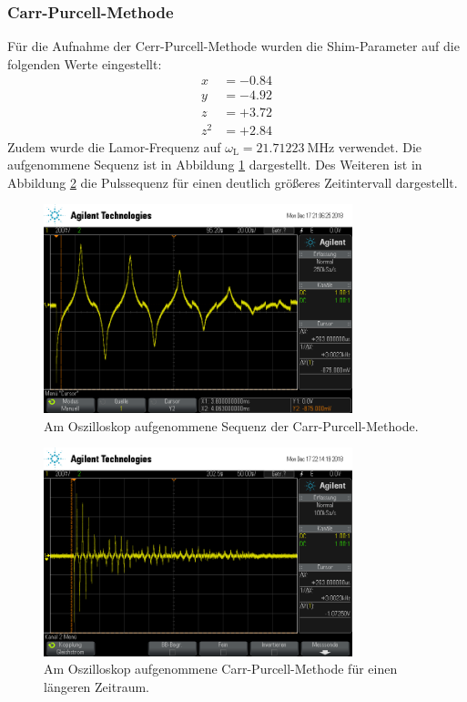 \subsubsection{Carr-Purcell-Methode}
Für die Aufnahme der Cerr-Purcell-Methode wurden die Shim-Parameter auf die
folgenden Werte eingestellt:
\begin{align*}
  x &= -\num{0.84} \\
  y &= -\num{4.92} \\
  z &= +\num{3.72} \\
  z^2 &= +\num{2.84}
\end{align*}
Zudem wurde die Lamor-Frequenz auf $\omega_\text{L} = \SI{21.71223}{\mega\hertz}$
verwendet. Die aufgenommene Sequenz ist in Abbildung \ref{fig:CP} dargestellt.
Des Weiteren ist in Abbildung \ref{fig:CP2} die Pulssequenz für einen
deutlich größeres Zeitintervall dargestellt.
\begin{figure}[htb]
  \centering
  \includegraphics[width=0.8\textwidth]{rohdaten/cp_2.png}
  \caption{Am Oszilloskop aufgenommene Sequenz der Carr-Purcell-Methode.}
  \label{fig:CP}
\end{figure}
\begin{figure}[htb]
  \centering
  \includegraphics[width=0.8\textwidth]{rohdaten/cp_3.png}
  \caption{Am Oszilloskop aufgenommene Carr-Purcell-Methode für einen längeren Zeitraum.}
  \label{fig:CP2}
\end{figure}
